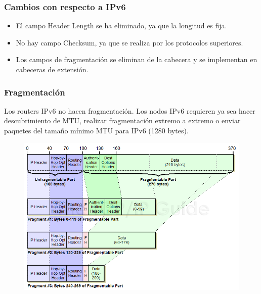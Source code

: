 \begin{onepage}
\subsubsection{Cambios con respecto a IPv6}
\begin{itemize}
    \item El campo Header Length se ha eliminado, ya que la longitud es fija.
    \item No hay campo Checksum, ya que se realiza por los protocolos superiores.
    \item Los campos de fragmentación se eliminan de la cabecera y se implementan en cabeceras de extensión.
\end{itemize}
\subsubsection{Fragmentación}
Los routers IPv6 no hacen fragmentación. Los nodos IPv6 requieren ya sea hacer descubrimiento de MTU, realizar fragmentación extremo a extremo o enviar paquetes del tamaño mínimo MTU para IPv6 (1280 bytes).\\

\begin{figure}[H]
    \centering \includegraphics[width=\textwidth]{img/ipv6_fragm.png}
\end{figure}
\end{onepage}
